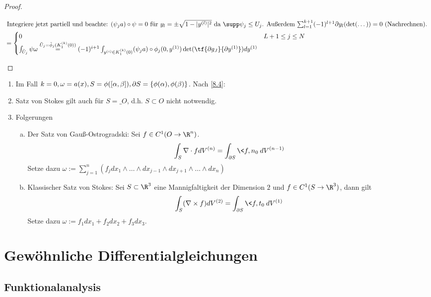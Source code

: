 \documentclass[a4paper,10pt]{scrbook}
\begin{document}
\begin{proof}
\begin{enumerate}[1)]
\begin{align*}
				\intertext{
					Integriere jetzt partiell und beachte: $(\psi_j a)\circ \psi = 0$ für $y_l = \pm \sqrt{1-|y^{(l)}|^2}$ da $\supp \psi_j \le U_j$.
					Außerdem $\sum_{l=1}^{k+1} (-1)^{l+1} \d y_l (\det (\dotsc)) = 0$ (Nachrechnen).
				}
				&= \begin{cases}
					0 & L+1 \le j \le N \\
					\int_{\tilde U_j} \psi \omega \stackrel{\tilde U_j = \tilde \phi_j(K_1^{(k)}(0))}= (-1)^{i+1} \int_{y^{(i)}\in K_1^{(k)}(0)} (\psi_j a) \circ \phi_j (0,y^{(1)}) \det(\tf{\d g_J}{\d y^{(1)}}) dy^{(1)} & 
				\end{cases}
			\end{align*}
	\end{enumerate}
\end{proof}

\begin{nt*} \label{8.8}
	\begin{enumerate}[1)]
		\item
			Im Fall $k=0, \omega = a(x), S = \phi([\alpha,\beta]), \partial S = \{\phi(\alpha), \phi(\beta)\}$.
			Nach \ref{8.4}:
		\item
			Satz von Stokes gilt auch für $S= \_{O}$, d.h. $S \subset O$ nicht notwendig.
		\item
			Folgerungen
			\begin{enumerate}[a)]
				\item
					Der Satz von Gauß-Ostrogradski:
					Sei $f\in C^1(O\to \R^n)$.
					\[
						\int_{S} \nabla \cdot f dV^{(n)} = \int_{\d S} \<f,n_0\> dV^{(n-1)}
					\]
					Setze dazu $\omega := \sum_{j=1}^n (f_j dx_1 \wedge \dotsc \wedge dx_{j-1} \wedge dx_{j+1} \wedge \dotsc \wedge dx_n)$
				\item
					Klassischer Satz von Stokes:
					Sei $S \subset \R^3$ eine Mannigfaltigkeit der Dimension $2$ und $f \in C^1(S \to \R^3)$, dann gilt
					\[
						\int_S (\nabla \times f) dV^{(2)} = \int_{\d S}\<f,t_0\> dV^{(1)}
					\]
					Setze dazu $\omega := f_1 dx_1 + f_2 dx_2 + f_3 dx_3$.
			\end{enumerate}
	\end{enumerate}
\end{nt*}


\chapter{Gewöhnliche Differentialgleichungen}


\section{Funktionalanalysis}
\end{document}
